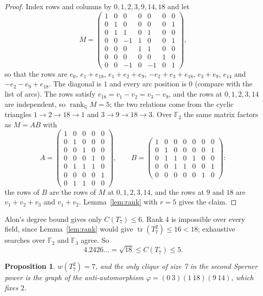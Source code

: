 \documentclass[11pt]{article}
\newtheorem{proposition}[theorem]{Proposition}
\theoremstyle{definition}
\theoremstyle{remark}
\newcommand{\F}{\mathbb{F}}
\newcommand{\Q}{\mathbb{Q}}
\newcommand{\tr}{\operatorname{tr}}
\newcommand{\rk}{\operatorname{rank}}
\begin{document}
\begin{proof}
Index rows and columns by $0, 1, 2, 3, 9, 14, 18$ and let
\[
M = \begin{pmatrix}
1 & 0 & 0 & 0 & 0 & 0 & 0\\
0 & 1 & 0 & 0 & 0 & 0 & 1\\
0 & 1 & 1 & 0 & 1 & 0 & 0\\
0 & 0 & -1 & 1 & 0 & 0 & 1\\
0 & 0 & 0 & 1 & 1 & 0 & 0\\
0 & 0 & 0 & 0 & 0 & 1 & 0\\
0 & 0 & -1 & 0 & -1 & 0 & 1
\end{pmatrix},
\]
so that the rows are $e_0$, $e_1 + e_{18}$, $e_1 + e_2 + e_9$, $-e_2 + e_3 + e_{18}$, $e_3 + e_9$,
$e_{14}$ and $-e_2 - e_9 + e_{18}$. The diagonal is $1$ and every arc position is $0$ (compare with
the list of arcs). The rows satisfy $v_{18} = v_1 - v_2 = v_3 - v_9$, and the rows at $0, 1, 2, 3, 14$ are
independent, so $\rk_\Q M = 5$; the two
relations come from the cyclic triangles $1 \to 2 \to 18 \to 1$ and $3 \to 9 \to 18 \to 3$. Over
$\F_2$ the same matrix factors as $M = AB$ with
\[
A = \begin{pmatrix}
1&0&0&0&0\\ 0&1&0&0&0\\ 0&0&1&0&0\\ 0&0&0&1&0\\ 0&1&1&1&0\\ 0&0&0&0&1\\ 0&1&1&0&0
\end{pmatrix},
\qquad
B = \begin{pmatrix}
1&0&0&0&0&0&0\\ 0&1&0&0&0&0&1\\ 0&1&1&0&1&0&0\\ 0&0&1&1&0&0&1\\ 0&0&0&0&0&1&0
\end{pmatrix}:
\]
the rows of $B$ are the rows of $M$ at $0, 1, 2, 3, 14$, and the rows at $9$ and $18$ are
$v_1 + v_2 + v_3$ and $v_1 + v_2$. Lemma~\ref{lem:rank} with $r = 5$ gives the claim.
\end{proof}

Alon's degree bound gives only $C(T_7) \le 6$. Rank 4 is impossible over every field, since
Lemma~\ref{lem:rank} would give $\tr(T_7^2) \le 16 < 18$; exhaustive searches over $\F_2$ and
$\F_3$ agree. So
\[
4.2426\ldots = \sqrt{18} \le C(T_7) \le 5 .
\]

\begin{proposition}\label{prop:w2}
$w(T_7^2) = 7$, and the only clique of size 7 in the second Sperner power is the graph of the
anti-automorphism $\varphi = (0\ 3)(1\ 18)(9\ 14)$, which fixes $2$.
\end{proposition}
\end{document}

